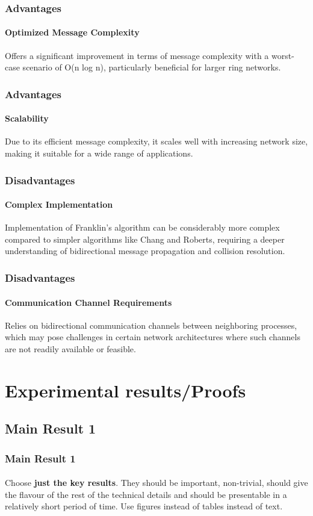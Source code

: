 \documentclass[11pt]{beamer}              %
\begin{document}
\begin{frame}
\frametitle{Advantages}
\framesubtitle{Optimized Message Complexity}
Offers a significant improvement in terms of message complexity with a worst-case scenario of O(n log n), particularly beneficial for larger ring networks.
\end{frame}

\begin{frame}
    \frametitle{Advantages}
    \framesubtitle{Scalability}
    Due to its efficient message complexity, it scales well with increasing network size, making it suitable for a wide range of applications.
\end{frame}


\begin{frame}
    \frametitle{Disadvantages}
    \framesubtitle{Complex Implementation}
    Implementation of Franklin’s algorithm can be considerably more complex compared to simpler algorithms like Chang and Roberts, requiring a deeper understanding of bidirectional message propagation and collision resolution.
\end{frame}


\begin{frame}
    \frametitle{Disadvantages}
    \framesubtitle{Communication Channel Requirements}
    Relies on bidirectional communication channels between neighboring processes, which may pose challenges in certain network architectures where such channels are not readily available or feasible.
\end{frame}







\section{Experimental results/Proofs}

\subsection{Main Result 1}
\begin{frame}
\frametitle{Main Result 1}
\framesubtitle{}
Choose \textbf{just the key results}. They should be important, non-trivial, should give the flavour of the rest of the technical details and should be presentable in a relatively short period of time. Use figures instead of tables instead of text.
\nocite{fokking2013, tel2001, changroberts1979, franklin1982}

\end{frame}
\end{document}

